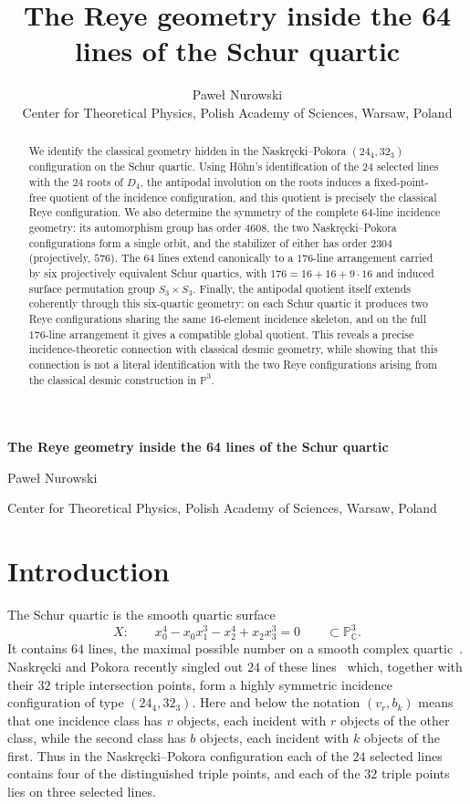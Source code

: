 \documentclass[10pt]{article}
\title{The Reye geometry inside the 64 lines of the Schur quartic}
\author{Pawe\l{} Nurowski\\[2mm]
\small Center for Theoretical Physics, Polish Academy of Sciences, Warsaw, Poland}
\date{}
\newcommand{\PP}{\mathbb P}
\newcommand{\C}{\mathbb C}
\begin{document}
\begingroup
\centering
{\Large\bfseries The Reye geometry inside the 64 lines of the Schur quartic\par}
\vspace{5pt}
{\normalsize Pawe\l{} Nurowski\par}
{\small Center for Theoretical Physics, Polish Academy of Sciences, Warsaw, Poland\par}
\vspace{7pt}
\endgroup

\begin{abstract}
\small
We identify the classical geometry hidden in the Naskr\k{e}cki--Pokora
$(24_4,32_3)$ configuration on the Schur quartic. Using H\"ohn's identification of the $24$ selected lines with the
$24$ roots of $D_4$, the antipodal involution on the roots induces a
fixed-point-free quotient of the incidence configuration, and this quotient is precisely the
classical Reye configuration.  We also determine the symmetry of the complete
$64$-line incidence geometry: its automorphism group has order $4608$, the two
Naskr\k{e}cki--Pokora configurations form a single orbit, and the stabilizer of
either has order $2304$ (projectively, $576$).  The $64$ lines extend
canonically to a $176$-line arrangement carried by six projectively equivalent
Schur quartics, with $176=16+16+9\cdot16$ and induced surface permutation group
$S_3\times S_3$.  Finally, the antipodal quotient itself extends coherently
through this six-quartic geometry: on each Schur quartic it produces two Reye
configurations sharing the same $16$-element incidence skeleton, and on the
full $176$-line arrangement it gives a compatible global quotient. This
reveals a precise incidence-theoretic connection with classical desmic
geometry, while showing that this connection is not a literal identification
with the two Reye configurations arising from the classical desmic
construction in $\PP^3$.
\end{abstract}

\vspace{-0.5em}

\section{Introduction}

The Schur quartic is the smooth quartic surface
\[
X:\qquad x_0^4-x_0x_1^3-x_2^4+x_2x_3^3=0
\qquad\subset\PP^3_{\C}.
\]
It contains $64$ lines, the maximal possible number on a smooth complex quartic~\cite{DIS17,DR25}.  Naskr\k{e}cki and Pokora recently singled out $24$ of these lines~\cite{NP26} which, together with their $32$ triple intersection points, form a highly symmetric incidence configuration of type $(24_4,32_3)$.  Here and below the notation $(v_r,b_k)$ means that one incidence class has $v$ objects, each incident with $r$ objects of the other class, while the second class has $b$ objects, each incident with $k$ objects of the first.  Thus in the Naskr\k{e}cki--Pokora configuration each of the $24$ selected lines contains four of the distinguished triple points, and each of the $32$ triple points lies on three selected lines.
\end{document}
